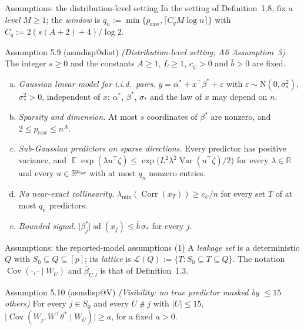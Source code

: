 \documentclass[aspectratio=169]{beamer}
\makeatletter
\newcommand{\asmdisp}[1]{\csname asmdisp@#1\endcsname}
\newcommand{\R}{\mathbb{R}}
\newcommand{\set}[1]{[#1]}
\newcommand{\abs}[1]{\lvert #1\rvert}
\DeclareMathOperator{\E}{\mathbb{E}}
\DeclareMathOperator{\Var}{Var}
\DeclareMathOperator{\Cov}{Cov}
\DeclareMathOperator{\Corr}{Corr}
\DeclareMathOperator{\sd}{sd}
\newcommand{\Normal}{\mathrm{N}}
\newcommand{\lmin}{\lambda_{\min}}
\newcommand{\praw}{p_{\mathrm{raw}}}
\newcommand{\sigs}{\sigma_*}
\newcommand{\bstar}{\beta^*}
\newcommand{\tstar}{\theta^*}
\newcommand{\Sz}{S_0}
\newcommand{\Lat}{\mathcal L}
\makeatother
\begin{document}
\begin{frame}{Assumptions: the distribution-level setting}
\small
\noindent In the setting of Definition~1.8, fix a \emph{level} $M\ge1$; the \emph{window} is
$q_n:=\min\{\praw,\lceil C_qM\log n\rceil\}$ with $C_q:=2(s(A+2)+4)/\log2$.

\begin{block}{Assumption 5.9 (\asmdisp{dist}) \textit{(Distribution-level setting; A6 Assumption~3)}}
The integer $s\ge0$ and the constants $A\ge1$, $L\ge1$, $c_\psi>0$ and $\bar b>0$ are fixed.
\begin{enumerate}[(a)]
  \item \emph{Gaussian linear model for i.i.d.\ pairs.} $y=\alpha^*+x^\top\bstar+\varepsilon$ with
    $\varepsilon\sim\Normal(0,\sigs^2)$, $\sigs^2>0$, independent of $x$; $\alpha^*$, $\bstar$, $\sigs$ and the law of $x$ may
    depend on $n$.
  \item \emph{Sparsity and dimension.} At most $s$ coordinates of $\bstar$ are nonzero, and
    $2\le\praw\le n^A$.
  \item \emph{Sub-Gaussian predictors on sparse directions.} Every predictor has positive variance,
    and $\E\exp(\lambda u^\top\zeta)\le\exp\big(L^2\lambda^2\Var(u^\top\zeta)/2\big)$ for every $\lambda\in\R$ and every
    $u\in\R^{\praw}$ with at most $q_n$ nonzero entries.
  \item \emph{No near-exact collinearity.} $\lmin(\Corr(x_T))\ge c_\psi/n$ for every set $T$ of at
    most $q_n$ predictors.
  \item \emph{Bounded signal.} $\abs{\beta^*_j}\sd(x_j)\le\bar b\,\sigs$ for every $j$.
\end{enumerate}
\end{block}
\end{frame}

\begin{frame}{Assumptions: the reported-model assumptions (1)}
\small
\noindent A \emph{leakage set} is a deterministic $Q$ with $\Sz\subseteq Q\subseteq\set{p}$; its \emph{lattice} is
$\Lat(Q):=\{T:\Sz\subseteq T\subseteq Q\}$. The notation $\Cov(\cdot,\cdot\mid W_U)$ and $\bar\beta_{U,l}$ is that of
Definition~1.3.

\begin{block}{Assumption 5.10 (\asmdisp{V}) \textit{(Visibility: no true predictor masked by $\le15$ others)}}
For every $j\in\Sz$ and every $U\not\ni j$ with $\abs{U}\le15$, $\abs{\Cov(W_j,W^\top\tstar\mid W_U)}\ge a$, for a fixed
$a>0$.
\end{block}
\end{frame}
\end{document}
